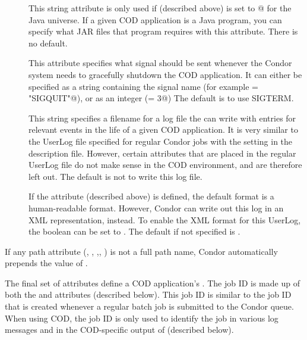 \begin{description}
 \item[] This string attribute is only used if
    (described above) is set to @ for the
   Java universe.
   If a given COD application is a Java program, you can specify what
   JAR files that program requires with this attribute.
   There is no default.

 \item[] This attribute specifies what signal should be
   sent whenever the Condor system needs to gracefully shutdown the
   COD application.
   It can either be specified as a string containing the signal name
   (for example \verb@KillSig = "SIGQUIT"@), or as an integer
   (\verb@KillSig = 3@)
   The default is to use SIGTERM.

 \item[] This string specifies a filename for a
   log file the  can write with entries for relevant 
   events in the life of a given COD application.
   It is very similar to the UserLog file specified for regular Condor
   jobs with the  setting in the  description
   file.
   However, certain attributes that are placed in the regular UserLog
   file do not make sense in the COD environment, and are therefore
   left out.
   The default is not to write this log file.

 \item[] If the 
   attribute (described above) is defined, the default format is a
   human-readable format.
   However, Condor can write out this log in an XML representation,
   instead.
   To enable the XML format for this UserLog, the
    boolean can be set to \verb@TRUE@.
   The default if not specified is \verb@FALSE@.

\end{description}

\Note If any path attribute (, ,
,, ) is not a full path name,
Condor automatically prepends the value of .



The final set of attributes define a COD application's .
The job ID is made up of both the  and 
attributes (described below).
This job ID is similar to the job ID that is created whenever a
regular batch job is submitted to the Condor queue.
When using COD, the job ID is only used to identify the job in various
log messages and in the COD-specific output of 
(described below).

